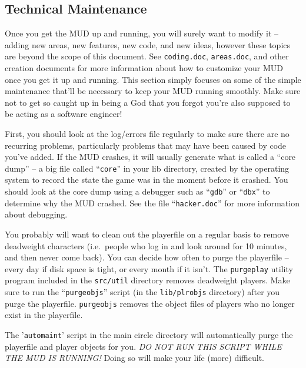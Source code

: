 \documentclass[11pt]{article}
\begin{document}
\subsection{Technical Maintenance}
Once you get the MUD up and running, you will surely want to modify it -- adding new areas, new features, new code, and new ideas, however these topics are beyond the scope of this document.  See \texttt{coding.doc}, \texttt{areas.doc}, and other creation documents for more information about how to customize your MUD once you get it up and running.  This section simply focuses on some of the simple maintenance that'll be necessary to keep your MUD running smoothly. Make sure not to get so caught up in being a God that you forgot you're also supposed to be acting as a software engineer!
\par
First, you should look at the log/errors file regularly to make sure there are no recurring problems, particularly problems that may have been caused by code you've added.  If the MUD crashes, it will usually generate what is called a ``core dump'' -- a big file called ``\texttt{core}'' in your lib directory, created by the operating system to record the state the game was in the moment before it crashed.  You should look at the core dump using a debugger such as ``\texttt{gdb}'' or ``\texttt{dbx}'' to determine why the MUD crashed.  See the file ``\texttt{hacker.doc}'' for more information about debugging.
\par
You probably will want to clean out the playerfile on a regular basis to remove deadweight characters (i.e.\ people who log in and look around for 10 minutes, and then never come back).  You can decide how often to purge the playerfile -- every day if disk space is tight, or every month if it isn't.  The \texttt{purgeplay} utility program included in the \texttt{src/util} directory removes deadweight players.  Make sure to run the ``\texttt{purgeobjs}'' script (in the \texttt{lib/plrobjs} directory) after you purge the playerfile.  \texttt{purgeobjs} removes the object files of players who no longer exist in the playerfile.
\par
The '\texttt{automaint}' script in the main circle directory will automatically purge the playerfile and player objects for you.  {\em DO NOT RUN THIS SCRIPT WHILE THE MUD IS RUNNING!}  Doing so will make your life (more) difficult.
\end{document}
